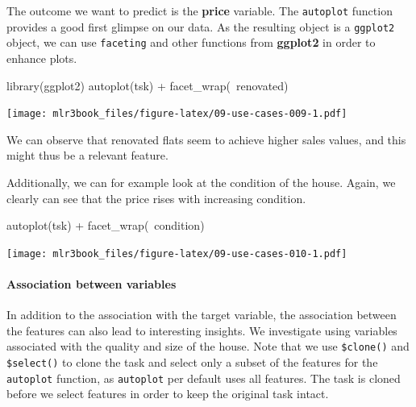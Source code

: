 \documentclass[]{article}
\newenvironment{Shaded}{}{}
\newcommand{\KeywordTok}[1]{\textcolor[rgb]{0.00,0.00,1.00}{#1}}
\newcommand{\NormalTok}[1]{#1}
\newcommand{\OperatorTok}[1]{#1}
\newcommand{\StringTok}[1]{\textcolor[rgb]{0.00,0.50,0.50}{#1}}
\let\oldparagraph\paragraph
\renewcommand{\paragraph}[1]{\oldparagraph{#1}\mbox{}}
\renewenvironment{Shaded} {\begin{snugshade}\small} {\end{snugshade}}
\begin{document}
The outcome we want to predict is the \textbf{price} variable.
The \texttt{autoplot} function provides a good first glimpse on our data.
As the resulting object is a \texttt{ggplot2} object, we can use \texttt{faceting} and other functions from \textbf{ggplot2} in order to enhance plots.

\begin{Shaded}
\begin{Highlighting}[]
\KeywordTok{library}\NormalTok{(ggplot2)}
\KeywordTok{autoplot}\NormalTok{(tsk) }\OperatorTok{+}\StringTok{ }\KeywordTok{facet_wrap}\NormalTok{(}\OperatorTok{~}\NormalTok{renovated)}
\end{Highlighting}
\end{Shaded}

\texttt{[image: mlr3book\_files/figure-latex/09-use-cases-009-1.pdf]}

We can observe that renovated flats seem to achieve higher sales values, and this might thus be a relevant feature.

Additionally, we can for example look at the condition of the house.
Again, we clearly can see that the price rises with increasing condition.

\begin{Shaded}
\begin{Highlighting}[]
\KeywordTok{autoplot}\NormalTok{(tsk) }\OperatorTok{+}\StringTok{ }\KeywordTok{facet_wrap}\NormalTok{(}\OperatorTok{~}\NormalTok{condition)}
\end{Highlighting}
\end{Shaded}

\texttt{[image: mlr3book\_files/figure-latex/09-use-cases-010-1.pdf]}

\hypertarget{association-between-variables}{%
\paragraph{Association between variables}\label{association-between-variables}}

In addition to the association with the target variable, the association between the features can also lead to interesting insights.
We investigate using variables associated with the quality and size of the house.
Note that we use \texttt{\$clone()} and \texttt{\$select()} to clone the task and select only a subset of the features for the \texttt{autoplot} function, as \texttt{autoplot} per default uses all features.
The task is cloned before we select features in order to keep the original task intact.
\end{document}
